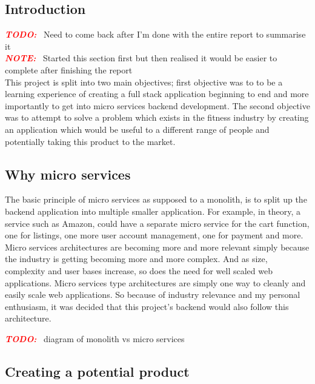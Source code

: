 \documentclass{article}
\newcommand{\vspaceconst}{-2ex}
\newcommand{\TODO}{\textbf{\textit{\textcolor{red}{TODO:}}} }
\newcommand{\NOTE}{\textbf{\textit{\textcolor{red}{NOTE:}}} }
\begin{document}
\begin{multicols}{2}
\section{Introduction}
\vspace{\vspaceconst}

\TODO~Need to come back after I'm done with the entire report to summarise it\\
\NOTE~Started this section first but then realised it would be easier to complete after finishing the report\\

This project is split into two main objectives; first objective was to to be a learning experience of creating a full stack application beginning to end and more importantly to get into micro services backend development. The second objective was to attempt to solve a problem which exists in the fitness industry by creating an application which would be useful to a different range of people and potentially taking this product to the market.


\subsection{Why micro services}
\vspace{\vspaceconst}

The basic principle of micro services as supposed to a monolith, is to split up the backend application into multiple smaller application. For example, in theory, a service such as Amazon, could have a separate micro service for the cart function, one for listings, one more user account management, one for payment and more.
Micro services architectures are becoming more and more relevant simply because the industry is getting becoming more and more complex. And as size, complexity and user bases increase, so does the need for well scaled web applications. Micro services type architectures are simply one way to cleanly and easily scale web applications. So because of industry relevance and my personal enthusiasm, it was decided that this project's backend would also follow this architecture. 

\TODO~diagram of monolith vs micro services

\subsection{Creating a potential product}
\vspace{\vspaceconst}


\end{multicols}
\end{document}
